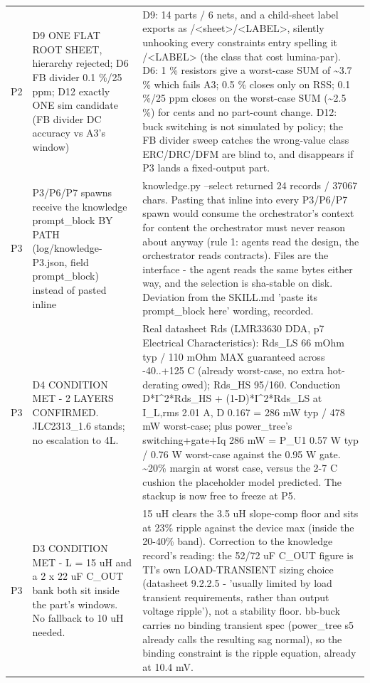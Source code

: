 \documentclass[11pt,a4paper]{article}
\begin{document}
{\begin{longtable}{lp{5.2cm}p{7.2cm}}
P2 & D9 ONE FLAT ROOT SHEET, hierarchy rejected; D6 FB divider 0.1 \%/25 ppm; D12 exactly ONE sim candidate (FB divider DC accuracy vs A3's window) & D9: 14 parts / 6 nets, and a child-sheet label exports as /\textless{}sheet\textgreater{}/\textless{}LABEL\textgreater{}, silently unhooking every constraints entry spelling it /\textless{}LABEL\textgreater{} (the class that cost lumina-par). D6: 1 \% resistors give a worst-case SUM of \textasciitilde{}3.7 \% which fails A3; 0.5 \% closes only on RSS; 0.1 \%/25 ppm closes on the worst-case SUM (\textasciitilde{}2.5 \%) for cents and no part-count change. D12: buck switching is not simulated by policy; the FB divider sweep catches the wrong-value class ERC/DRC/DFM are blind to, and disappears if P3 lands a fixed-output part. \\
P3 & P3/P6/P7 spawns receive the knowledge prompt\_block BY PATH (log/knowledge-P3.json, field prompt\_block) instead of pasted inline & knowledge.py --select returned 24 records / 37067 chars. Pasting that inline into every P3/P6/P7 spawn would consume the orchestrator's context for content the orchestrator must never reason about anyway (rule 1: agents read the design, the orchestrator reads contracts). Files are the interface - the agent reads the same bytes either way, and the selection is sha-stable on disk. Deviation from the SKILL.md 'paste its prompt\_block here' wording, recorded. \\
P3 & D4 CONDITION MET - 2 LAYERS CONFIRMED. JLC2313\_1.6 stands; no escalation to 4L. & Real datasheet Rds (LMR33630 DDA, p7 Electrical Characteristics): Rds\_LS 66 mOhm typ / 110 mOhm MAX guaranteed across -40..+125 C (already worst-case, no extra hot-derating owed); Rds\_HS 95/160. Conduction D{*}I\textasciicircum{}2{*}Rds\_HS + (1-D){*}I\textasciicircum{}2{*}Rds\_LS at I\_L,rms 2.01 A, D 0.167 = 286 mW typ / 478 mW worst-case; plus power\_tree's switching+gate+Iq 286 mW = P\_U1 0.57 W typ / 0.76 W worst-case against the 0.95 W gate. \textasciitilde{}20\% margin at worst case, versus the 2-7 C cushion the placeholder model predicted. The stackup is now free to freeze at P5. \\
P3 & D3 CONDITION MET - L = 15 uH and a 2 x 22 uF C\_OUT bank both sit inside the part's windows. No fallback to 10 uH needed. & 15 uH clears the 3.5 uH slope-comp floor and sits at 23\% ripple against the device max (inside the 20-40\% band). Correction to the knowledge record's reading: the 52/72 uF C\_OUT figure is TI's own LOAD-TRANSIENT sizing choice (datasheet 9.2.2.5 - 'usually limited by load transient requirements, rather than output voltage ripple'), not a stability floor. bb-buck carries no binding transient spec (power\_tree s5 already calls the resulting sag normal), so the binding constraint is the ripple equation, already at 10.4 mV. \\

\end{longtable}}
\end{document}
